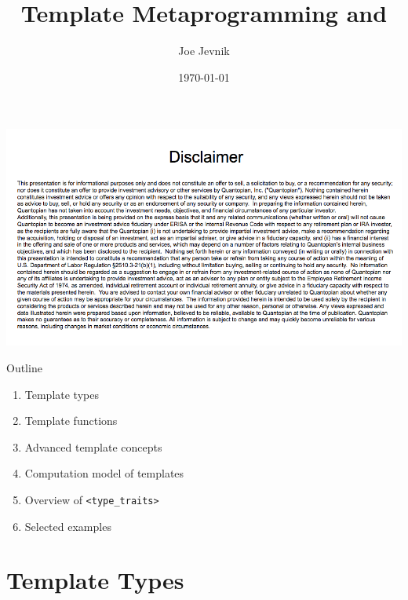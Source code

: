 \documentclass[table]{beamer}
\title{Template Metaprogramming and \typetraits}
\date{\today}
\author{Joe Jevnik}
\institute{Boston C++}
\newcommand{\typetraits}{\texttt{<type\_traits>}}
\begin{document}
\maketitle

\begin{frame}
  \begin{center}
    \includegraphics[width=1.00\textwidth]{images/disclaimer.png}
  \end{center}
\end{frame}

\begin{frame}{Outline}
  \begin{enumerate}
  \item Template types
  \item Template functions
  \item Advanced template concepts
  \item Computation model of templates
  \item Overview of \typetraits
  \item Selected examples
  \end{enumerate}
\end{frame}

\section{Template Types}
\end{document}
